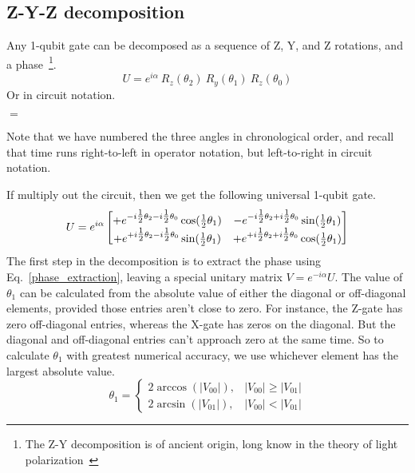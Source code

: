 \subsection{Z-Y-Z decomposition}
\label{sec:ZYZdeke}
Any 1-qubit gate can be decomposed as a sequence of Z, Y, and Z rotations, and a phase~\cite{Barenco1995b}\footnote{The Z-Y decomposition is of ancient origin, long know in the theory of light polarization~\cite{Sousa2006a}}.
\[
U =  e^{i\alpha}\ R_z(\theta_2)\ R_y(\theta_1)\ R_z(\theta_0)
\]
Or in circuit notation.
\begin{center}
$=$

\end{center}
Note that we have numbered the three angles in chronological order, and recall that time runs right-to-left in operator notation, but left-to-right in circuit notation. 

If multiply out the circuit, then we get the following universal 1-qubit gate.
\[
U = 
e^{i\alpha} \begin{bmatrix}
+e^{-i\tfrac{1}{2}\theta_2  -i\tfrac{1}{2}\theta_0} \cos(\tfrac{1}{2}\theta_1)
& -e^{-i\tfrac{1}{2}\theta_2 + i\tfrac{1}{2}\theta_0} \sin(\tfrac{1}{2}\theta_1)
\\
+e^{+i\tfrac{1}{2}\theta_2 - i\tfrac{1}{2}\theta_0} \sin(\tfrac{1}{2}\theta_1)
& +e^{+i\tfrac{1}{2}\theta_2 +i\tfrac{1}{2}\theta_0} \cos(\tfrac{1}{2}\theta_1)
\end{bmatrix}
\]
The first step in the decomposition is to extract the phase using Eq.~\eqref{phase_extraction}, leaving a special unitary matrix $V = e^{-i\alpha} U$.
%
The value of $\theta_1$ can be calculated from the absolute value of either the diagonal or off-diagonal elements, provided those entries aren't close to zero.
For instance, the Z-gate has zero off-diagonal entries, whereas the X-gate has zeros on the diagonal. But the diagonal and off-diagonal entries can't approach zero at the same time.  So to calculate $\theta_1$ with greatest numerical accuracy, we use whichever element has the largest absolute value.
\[
\theta_1 = 
  \begin{cases}
		2 \arccos(|V_{00}|), & |V_{00}| \geq |V_{01}|\\	
		2 \arcsin(|V_{01}|), & |V_{00}| < |V_{01}|		
	\end{cases} 
\]

